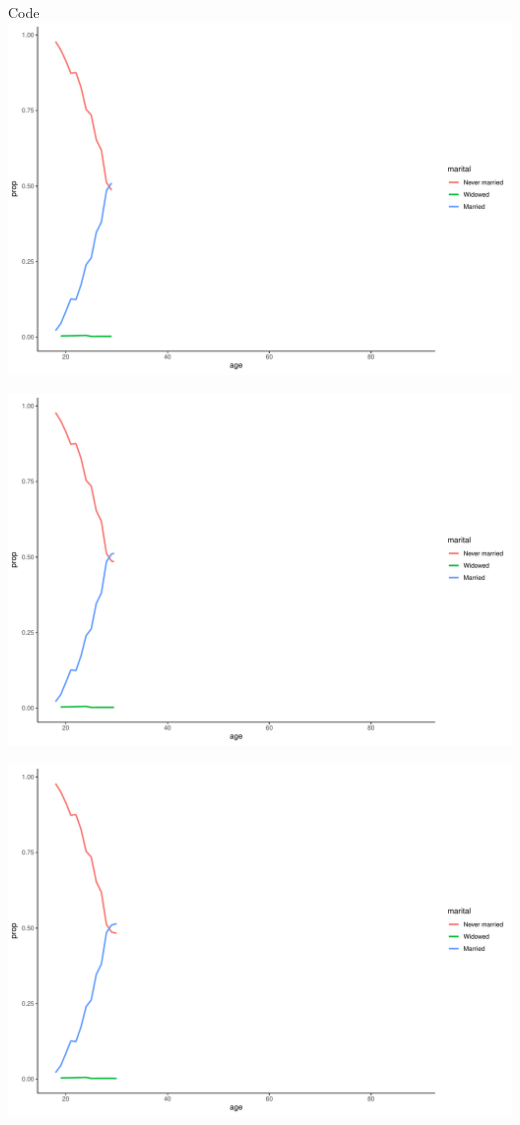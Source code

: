 \documentclass[
  ignorenonframetext,
]{beamer}
\begin{document}
\begin{frame}[fragile]{Code}
\includegraphics{gss_cat_files/figure-beamer/unnamed-chunk-1-20.pdf}

\includegraphics{gss_cat_files/figure-beamer/unnamed-chunk-1-21.pdf}

\includegraphics{gss_cat_files/figure-beamer/unnamed-chunk-1-22.pdf}


\end{frame}
\end{document}
